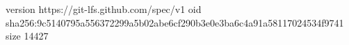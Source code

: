 version https://git-lfs.github.com/spec/v1
oid sha256:9c5140795a556372299a5b02abe6cf290b3e0e3ba6c4a91a58117024534f9741
size 14427
